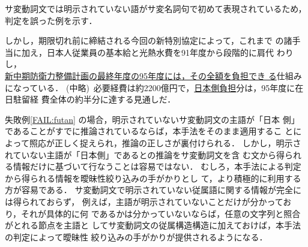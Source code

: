サ変動詞文では明示されていない語がサ変名詞句で初めて表現されているため，
判定を誤った例を示す．
\begin{FAIL}
\fail しかし，期限切れ前に締結される今回の新特別協定によって，これまで
の諸手当に加え，日本人従業員の基本給と光熱水費を91年度から段階的に肩代
わりし，\\
\underline{新中期防衛力整備計画の最終年度の95年度には，その全額を負担でき
る}仕組みにな\hspace*{0.2mm}って\hspace*{0.2mm}い\hspace*{0.2mm}る．\hspace*{0.2mm}
(中略)\ 
必\hspace*{0.4mm}要\hspace*{0.4mm}経\hspace*{0.4mm}費\hspace*{0.4mm}は\hspace*{0.2mm}約\hspace*{0.6mm}2\hspace*{0.2mm}2\hspace*{0.2mm}0\hspace*{0.2mm}0\hspace*{0.2mm}億\hspace*{0.4mm}円\hspace*{0.2mm}で，\hspace*{0.2mm}\underline{\hspace*{0.2mm}日\hspace*{0.4mm}本\hspace*{0.4mm}側\hspace*{0.4mm}負\hspace*{0.4mm}担}\hspace*{0.4mm}分\hspace*{0.4mm}は，\hspace*{0.4mm}9\hspace*{0.2mm}5\hspace*{0.2mm}年\hspace*{0.4mm}度\hspace*{0.2mm}に\hspace*{0.2mm}在\\日駐留経
費全体の約半分に達する見通しだ．\label{FAIL:futan}
\end{FAIL}
失敗例\ref{FAIL:futan} の場合，明示されていないサ変動詞文の主語が「日本
側」であることがすでに推論されているならば，本手法をそのまま適用するこ
とによって照応が正しく捉えられ，推論の正しさが裏付けられる．
しかし，明示されていない主語が「日本側」であるとの推論をサ変動詞文を含
む文から得られる情報だけに基づいて行なうことは容易ではない．
むしろ，本手法による判定から得られる情報を曖昧性絞り込みの手がかりとし
て，より積極的に利用する方が容易である．
サ変動詞文で明示されていない従属語に関する情報が完全には得られておらず，
例えば，主語が明示されていないことだけが分かっており，それが具体的に何
であるかは分かっていないならば，任意の文字列と照合がとれる節点を主語と
してサ変動詞文の従属構造構造に加えておけば，本手法の判定によって曖昧性
絞り込みの手がかりが提供されるようになる．

